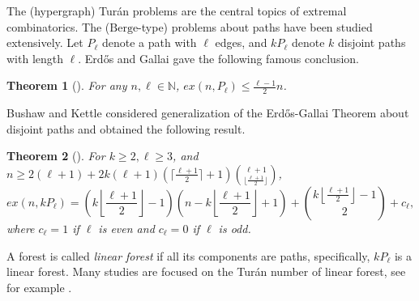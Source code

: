 \documentclass[12pt]{article}%
\newtheorem{theorem}{Theorem}[section]
\newcommand{\ber}{\text{Berge-}}
\newcommand{\lf}{\left\lfloor}
\newcommand{\rf}{\right\rfloor}
\begin{document}
 The (hypergraph) Tur\'an problems are the central topics of extremal combinatorics. The  ($\ber$type) problems about paths have been studied extensively. Let $P_{\ell}$ denote a path with $\ell$ edges, and $kP_{\ell}$ denote $k$ disjoint paths with length $\ell$. Erd\H{o}s and Gallai \cite{erdos1959maximal} gave the following famous conclusion.%
\begin{theorem}[\cite{erdos1959maximal}]\label{thm: Pl}
    For any $n,\ell\in\mathbb{N}$, $ex(n,P_{\ell})\leq \frac{\ell-1}{2}n$.
\end{theorem}
Bushaw and  Kettle \cite{bushaw2011turan} considered generalization of the Erd\H{o}s-Gallai Theorem about disjoint paths and obtained the following result.
\begin{theorem}[\cite{bushaw2011turan}]\label{thm:kPl}
For $k\geq 2,\ell\geq 3$, and $n\geq 2(\ell+1)+2k(\ell+1)\left(\lceil\frac{\ell+1}{2}\rceil+1\right)\binom{\ell+1}{\lfloor\frac{\ell+1}{2}\rfloor}$,
\begin{equation*}
    ex(n,kP_{\ell})=\left(k\lf\frac{\ell+1}{2}\rf-1\right)\left(n-k\lf\frac{\ell+1}{2}\rf+1\right)+\binom{k\lf\frac{\ell+1}{2}\rf-1}{2}+c_{\ell},
\end{equation*}
where $c_\ell=1$ if $\ell$ is even and $c_{\ell}=0$ if $\ell$ is odd.
\end{theorem}
A forest is called \emph{linear forest} if all its components are paths, specifically, $kP_\ell$ is a linear forest. Many studies are focused on the Tur\'an number of linear forest, see for example \cite{bushaw2011turan,lidicky2012turan,yuan2021turan, Zhang2025TuranTP}.
\end{document}
